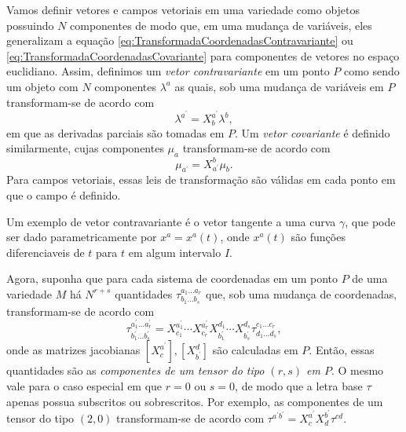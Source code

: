 Vamos definir vetores e campos vetoriais em uma variedade como objetos possuindo $N$ componentes de modo que, em uma mudança de variáveis, eles generalizam a equação \eqref{eq:TransformadaCoordenadasContravariante} ou \eqref{eq:TransformadaCoordenadasCovariante} para componentes de vetores no espaço euclidiano. Assim, definimos um \textit{vetor contravariante} em um ponto $P$ como sendo um objeto com $N$ componentes $\lambda^a$ as quais, sob uma mudança de variáveis em $P$ transformam-se de acordo com
\begin{equation}\label{eq:TransformadaCoordenadasContraVariedade}
	\boxed{
		\lambda^{a^\prime} = X^{a^\prime}_b\lambda^b ,
	}
\end{equation}
em que as derivadas parciais são tomadas em $P$. Um \textit{vetor covariante} é definido similarmente, cujas componentes $\mu_a$ transformam-se de acordo com
\begin{equation}
	\boxed{
		\mu_{a^\prime}=X^b_{a^\prime}\mu_b .
	}
\end{equation}
 Para campos vetoriais, essas leis de transformação são válidas em cada ponto em que o campo é definido.

 Um exemplo de vetor contravariante é o vetor tangente a uma curva $\gamma$, que pode ser dado parametricamente por $x^a=x^a(t)$, onde $x^a(t)$ são funções diferenciaveis de $t$ para $t$ em algum intervalo $I$. 

Agora, suponha que para cada sistema de coordenadas em um ponto $P$ de uma variedade $M$ há $N^{r+s}$ quantidades $\tau^{a_1\ldots a_r}_{b_1\ldots b_s}$ que, sob uma mudança de coordenadas, transformam-se de acordo com
\begin{equation}\label{eq:TransformacaoCoordenadaTensor}
	\boxed{
		\tau_{b_{1}^{\prime} \ldots b_{s}^{\prime}}^{a_{1}^{\prime} \ldots a_{r}^{\prime}}=X_{c_{1}}^{a_{1}^{\prime}} \cdots X_{c_{r}}^{a_{r}^{\prime}} X_{b_{1}^{\prime}}^{d_{1}} \cdots X_{b_{s}^{\prime}}^{d_{s}} \tau_{d_{1} \ldots d_{s}}^{c_{1} \ldots c_{r}}   ,
	}
\end{equation}
onde as matrizes jacobianas $[X^{a^\prime}_c],[X^d_{b^\prime}]$ são calculadas em $P$. Então, essas quantidades são as \textit{componentes de um tensor do tipo $(r,s)$ em $P$}. O mesmo vale para o caso especial em que $r=0$ ou $s=0$, de modo que a letra base $\tau$ apenas possua subscritos ou sobrescritos. Por exemplo, as componentes de um tensor do tipo $(2,0)$ transformam-se de acordo com $\tau^{a^{\prime} b^{\prime}}=X_{c}^{a^{\prime}} X_{d}^{b^{\prime}} \tau^{c d}$.

